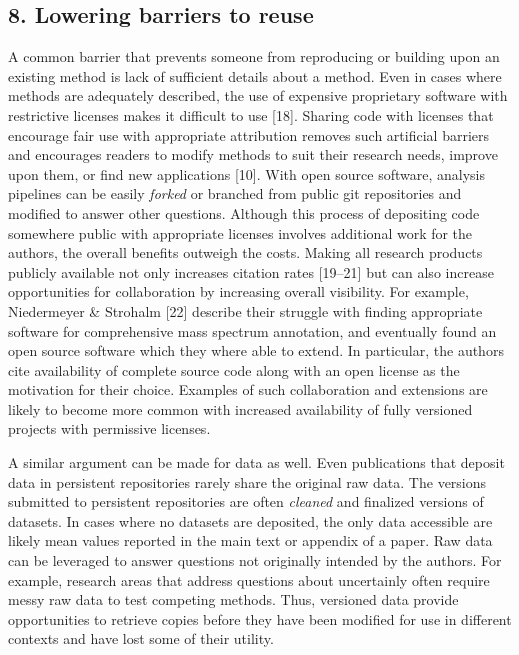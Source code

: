 \documentclass[]{article}
\begin{document}
\subsection{8. Lowering barriers to reuse}

A common barrier that prevents someone from reproducing or building upon
an existing method is lack of sufficient details about a method. Even in
cases where methods are adequately described, the use of expensive
proprietary software with restrictive licenses makes it difficult to use
{[}18{]}. Sharing code with licenses that encourage fair use with
appropriate attribution removes such artificial barriers and encourages
readers to modify methods to suit their research needs, improve upon
them, or find new applications {[}10{]}. With open source software,
analysis pipelines can be easily \emph{forked} or branched from public
git repositories and modified to answer other questions. Although this
process of depositing code somewhere public with appropriate licenses
involves additional work for the authors, the overall benefits outweigh
the costs. Making all research products publicly available not only
increases citation rates {[}19--21{]} but can also increase
opportunities for collaboration by increasing overall visibility. For
example, Niedermeyer \& Strohalm {[}22{]} describe their struggle with
finding appropriate software for comprehensive mass spectrum annotation,
and eventually found an open source software which they where able to
extend. In particular, the authors cite availability of complete source
code along with an open license as the motivation for their choice.
Examples of such collaboration and extensions are likely to become more
common with increased availability of fully versioned projects with
permissive licenses.

A similar argument can be made for data as well. Even publications that
deposit data in persistent repositories rarely share the original raw
data. The versions submitted to persistent repositories are often
\emph{cleaned} and finalized versions of datasets. In cases where no
datasets are deposited, the only data accessible are likely mean values
reported in the main text or appendix of a paper. Raw data can be
leveraged to answer questions not originally intended by the authors.
For example, research areas that address questions about uncertainly
often require messy raw data to test competing methods. Thus, versioned
data provide opportunities to retrieve copies before they have been
modified for use in different contexts and have lost some of their
utility.
\end{document}

